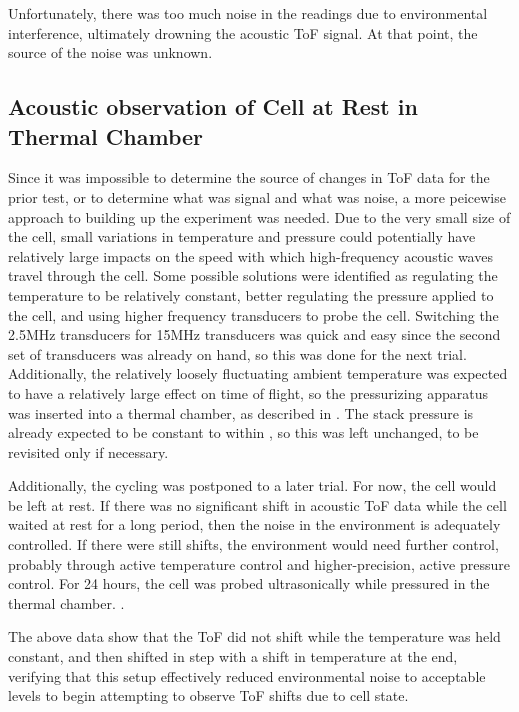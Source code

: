 Unfortunately, there was too much noise in the readings due to environmental interference, ultimately drowning the acoustic ToF signal. At that point, the source of the noise was unknown.

    
\subsection{Acoustic observation of Cell at Rest in Thermal Chamber}

Since it was impossible to determine the source of changes in ToF data for the prior test, or to determine what was signal and what was noise, a more peicewise approach to building up the experiment was needed. Due to the very small size of the cell, small variations in temperature and pressure could potentially have relatively large impacts on the speed with which high-frequency acoustic waves travel through the cell. Some possible solutions were identified as regulating the temperature to be relatively constant, better regulating the pressure applied to the cell, and using higher frequency transducers to probe the cell. Switching the 2.5MHz transducers for 15MHz transducers was quick and easy since the second set of transducers was already on hand, so this was done for the next trial. Additionally, the relatively loosely fluctuating ambient temperature was expected to have a relatively large effect on time of flight, so the pressurizing apparatus was inserted into a thermal chamber, as described in . The stack pressure is already expected to be constant to within , so this was left unchanged, to be revisited only if necessary.

Additionally, the cycling was postponed to a later trial. For now, the cell would be left at rest. 
If there was no significant shift in acoustic ToF data while the cell waited at rest for a long period, then the noise in the environment is adequately controlled. 
If there were still shifts, the environment would need further control, probably through active temperature control and higher-precision, active pressure control. 
For 24 hours, the cell was probed ultrasonically while pressured in the thermal chamber. .

The above data show that the ToF did not shift while the temperature was held constant, and then shifted in step with a shift in temperature at the end, verifying that this setup effectively reduced environmental noise to acceptable levels to begin attempting to observe ToF shifts due to cell state.

